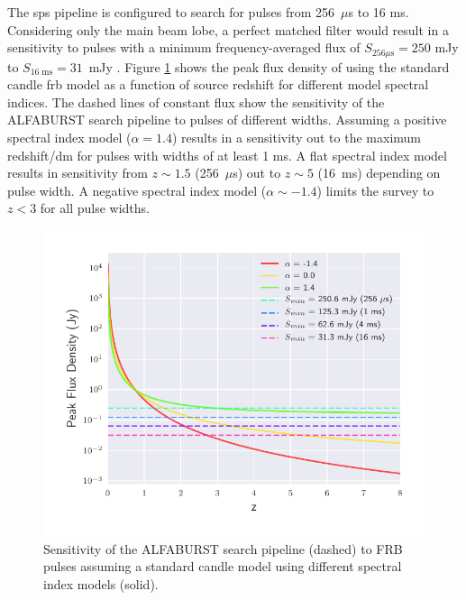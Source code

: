 \documentclass[a4paper,fleqn,usenatbib]{mnras}
\begin{document}
The \gls{sps} pipeline is configured to search for pulses from 256~$\mu$s to 16
ms. Considering only the main beam lobe, a perfect matched filter would result
in a sensitivity to pulses with a minimum frequency-averaged flux of $S_{256
\mu\textrm{s}} = 250$ mJy to $S_{16 \; \textrm{ms}} = 31$~mJy
\citep{2015MNRAS.452.1254K}. Figure \ref{fig:fwhm_sefd_z} shows the peak flux
density of using the standard candle \gls{frb} model as a function of source
redshift for different model spectral indices. The dashed lines of constant flux
show the sensitivity of the ALFABURST search pipeline to pulses of different
widths. Assuming a positive spectral index model ($\alpha=1.4$) results in a
sensitivity out to the maximum redshift/\gls{dm} for pulses with widths of at
least 1 ms. A flat spectral index model results in sensitivity from $z \sim 1.5$
(256~$\mu$s) out to $z \sim 5$ (16~ms) depending on pulse width. A negative
spectral index model ($\alpha \sim -1.4$) limits the survey to $z < 3$ for all
pulse widths.

\begin{figure}
    \includegraphics[width=1.0\linewidth]{figures/fwhm_sefd_z_relation.pdf}
    \caption{Sensitivity of the ALFABURST search pipeline (dashed) to FRB pulses
    assuming a standard candle model using different spectral index models
    (solid).
    }
    \label{fig:fwhm_sefd_z}
\end{figure}
\end{document}
